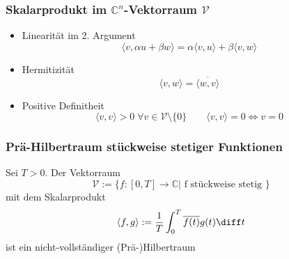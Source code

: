 \begin{emphbox}
    \subsubsection{Skalarprodukt im $\mathbb C^n$-Vektorraum $\mathcal V$}
    \begin{itemize}
        \item Linearität im 2. Argument \begin{equation*}
                  \langle v, \alpha u + \beta w\rangle = \alpha\langle v,u\rangle + \beta\langle v,w\rangle
              \end{equation*}
        \item Hermitizität \begin{equation*}
                  \langle v,w\rangle = \overline{\langle w,v\rangle}
              \end{equation*}
        \item Positive Definitheit \begin{equation*}
                  \langle v,v\rangle > 0 \; \forall v\in\mathcal{V}\setminus\{0\} \qquad \langle v,v\rangle = 0 \Leftrightarrow v=0
              \end{equation*}
    \end{itemize}
\end{emphbox}

\begin{emphbox}
    \subsubsection{Prä-Hilbertraum stückweise stetiger Funktionen}
    Sei $T>0$. Der Vektorraum
    \begin{equation*}
        \mathcal V := \{f:[0,T]\rightarrow \mathbb C | \text{ f stückweise stetig }\}
    \end{equation*}
    mit dem Skalarprodukt
    \begin{equation*}
        \langle f, g\rangle := \frac{1}{T}\int_0^T \overline{f(t)}g(t) \diff t
    \end{equation*}
    ist ein nicht-vollständiger (Prä-)Hilbertraum
\end{emphbox}

